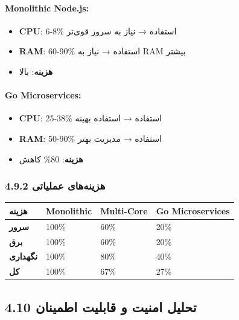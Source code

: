 \documentclass[
]{article}
\newcounter{none} %
\providecommand{\tightlist}{%
  \setlength{\itemsep}{0pt}\setlength{\parskip}{0pt}}
\begin{document}
\paragraph{Monolithic Node.js:}\label{monolithic-node.js-1}

\begin{itemize}
\tightlist
\item
  \textbf{CPU}: 6-8\% استفاده → نیاز به سرور قوی‌تر
\item
  \textbf{RAM}: 60-90\% استفاده → نیاز به RAM بیشتر
\item
  \textbf{هزینه}: بالا
\end{itemize}

\paragraph{Go Microservices:}\label{go-microservices-1}

\begin{itemize}
\tightlist
\item
  \textbf{CPU}: 25-38\% استفاده → استفاده بهینه
\item
  \textbf{RAM}: 50-90\% استفاده → مدیریت بهتر
\item
  \textbf{هزینه}: 80\% کاهش
\end{itemize}

\subsubsection{4.9.2 هزینه‌های
عملیاتی}\label{ux647ux632ux6ccux646ux647ux647ux627ux6cc-ux639ux645ux644ux6ccux627ux62aux6cc}

{\def\LTcaptype{none} %
\begin{longtable}[]{@{}llll@{}}
\toprule\noalign{}
هزینه & Monolithic & Multi-Core & Go Microservices \\
\midrule\noalign{}
\endhead
\bottomrule\noalign{}
\endlastfoot
\textbf{سرور} & 100\% & 60\% & 20\% \\
\textbf{برق} & 100\% & 60\% & 20\% \\
\textbf{نگهداری} & 100\% & 80\% & 40\% \\
\textbf{کل} & 100\% & 67\% & 27\% \\
\end{longtable}
}

\subsection{4.10 تحلیل امنیت و قابلیت
اطمینان}\label{ux62aux62dux644ux6ccux644-ux627ux645ux646ux6ccux62a-ux648-ux642ux627ux628ux644ux6ccux62a-ux627ux637ux645ux6ccux646ux627ux646}
\end{document}
